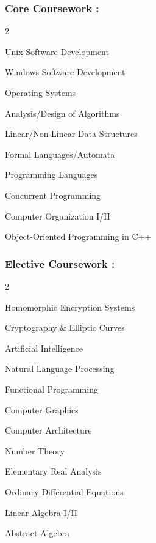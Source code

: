 \documentclass{article}
\newenvironment{mylist}[2]{
  \subsubsection*{#1}
  \begin{multicols}{#2}
  \small
  \begin{list}{}{}
   \setlength{\topsep}{0pt}
   \setlength{\itemsep}{1pt}
   \setlength{\parskip}{0pt}
   \setlength{\parsep}{0pt}}{\end{list}\end{multicols}\normalsize}
\begin{document}
\begin{mylist}{Core Coursework :}{2}
\item Unix Software Development
\item Windows Software Development
\item Operating Systems
\item Analysis/Design of Algorithms
\item Linear/Non-Linear Data Structures
\item Formal Languages/Automata
\item Programming Languages
\item Concurrent Programming
\item Computer Organization I/II
\item Object-Oriented Programming in C++
\end{mylist}

\begin{mylist}{Elective Coursework :}{2}
\item Homomorphic Encryption Systems
\item Cryptography \& Elliptic Curves
\item Artificial Intelligence
\item Natural Language Processing
\item Functional Programming
\item Computer Graphics
\item Computer Architecture
\item Number Theory
\item Elementary Real Analysis
\item Ordinary Differential Equations
\item Linear Algebra I/II
\item Abstract Algebra
\end{mylist}
\end{document}

